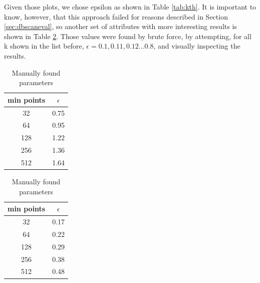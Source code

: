 \documentclass{article}
\begin{document}
	Given those plots, we chose epsilon as shown in Table \ref{tab:kth}.
	It is important to know, however, that this approach failed for reasons described in Section \ref{sec:dbscaneval}, so another set of attributes with more interesting results is shown in Table \ref{tab:dbscan}. Those values were found by brute force, by attempting, for all k shown in the list before, $\epsilon = 0.1, 0.11, 0.12\dots 0.8$, and visually inspecting the results.\\
	
	\begin{table}
		\parbox{.45\linewidth}{
			\centering
			\begin{tabular}{|c|c|}
				\hline
				min points & $\epsilon$\\
				\hline
				\rowcolor{Gray}
				32 & 0.75 \\
				64 & 0.95 \\
				\rowcolor{Gray}
				128 & 1.22 \\
				256 & 1.36 \\
				\rowcolor{Gray}
				512 & 1.64 \\
				\hline
			\end{tabular}
			\caption{K-th nearest neighbours parameters}
			\label{tab:kth}
		}
		\hfill
		\parbox{.45\linewidth}{
			\centering
			\begin{tabular}{|c|c|}
				\hline
				min points & $\epsilon$\\
				\hline
				\rowcolor{Gray}
				32 & 0.17 \\
				64 & 0.22 \\
				\rowcolor{Gray}
				128 & 0.29 \\
				256 & 0.38 \\
				\rowcolor{Gray}
				512 & 0.48 \\
				\hline
			\end{tabular}
			\caption{Manually found parameters}
			\label{tab:dbscan}
		}
	\end{table}
	
\end{document}

